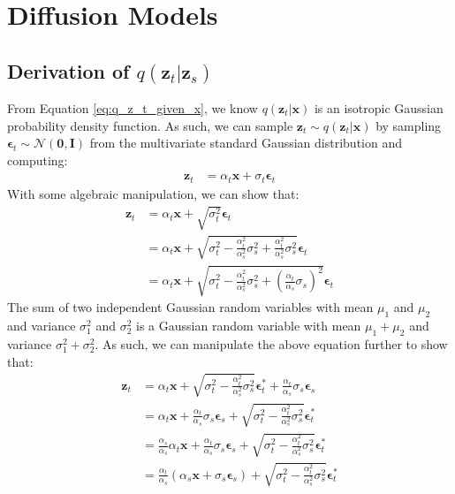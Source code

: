 \documentclass[ oneside,%
                    author={George Herbert},
                    degree={MSci},
                     title={Video Diffusion Models for Climate Simulations},
                  subtitle={}]{dissertation}
\begin{document}
\appendix

\chapter{Diffusion Models}
\label{appx:diffusion}

\section{Derivation of $q(\mathbf{z}_t|\mathbf{z}_s)$}
\label{appx:diffusion_q_z_t_given_z_s}

From Equation \ref{eq:q_z_t_given_x}, we know $q(\mathbf{z}_t|\mathbf{x})$ is an isotropic Gaussian probability density function. As such, we can sample $\mathbf{z}_t\sim q(\mathbf{z}_t|\mathbf{x})$ by sampling $\boldsymbol\epsilon_t\sim\mathcal{N}(\mathbf{0}, \mathbf{I})$ from the multivariate standard Gaussian distribution and computing:
\begin{align}
      \mathbf{z}_t&=\alpha_t\mathbf{x}+\sigma_t\boldsymbol\epsilon_t\label{eq:z_t}
\end{align}
With some algebraic manipulation, we can show that:
\begin{align}
      \mathbf{z}_t&=\alpha_t\mathbf{x}+\sqrt{\sigma_t^2}\boldsymbol\epsilon_t\\
      &=\alpha_t\mathbf{x}+\sqrt{\sigma_t^2-\frac{\alpha_t^2}{\alpha_s^2}\sigma_s^2+\frac{\alpha_t^2}{\alpha_s^2}\sigma_s^2}\boldsymbol\epsilon_t\\
      &=\alpha_t\mathbf{x}+\sqrt{\sigma_t^2-\frac{\alpha_t^2}{\alpha_s^2}\sigma_s^2+\left(\frac{\alpha_t}{\alpha_s}\sigma_s\right)^2}\boldsymbol\epsilon_t
\end{align}
The sum of two independent Gaussian random variables with mean $\mu_1$ and $\mu_2$ and variance $\sigma_1^2$ and $\sigma_2^2$ is a Gaussian random variable with mean $\mu_1+\mu_2$ and variance $\sigma_1^2+\sigma_2^2$. As such, we can manipulate the above equation further to show that:
\begin{align}
      \mathbf{z}_t&=\alpha_t\mathbf{x}+\sqrt{\sigma_t^2-\frac{\alpha_t^2}{\alpha_s^2}\sigma_s^2}\boldsymbol\epsilon_t^*+\frac{\alpha_t}{\alpha_s}\sigma_s\boldsymbol\epsilon_s\\
      &=\alpha_t\mathbf{x}+\frac{\alpha_t}{\alpha_s}\sigma_s\boldsymbol\epsilon_s+\sqrt{\sigma_t^2-\frac{\alpha_t^2}{\alpha_s^2}\sigma_s^2}\boldsymbol\epsilon_t^*\\
      &=\frac{\alpha_s}{\alpha_s}\alpha_t\mathbf{x}+\frac{\alpha_t}{\alpha_s}\sigma_s\boldsymbol\epsilon_s+\sqrt{\sigma_t^2-\frac{\alpha_t^2}{\alpha_s^2}\sigma_s^2}\boldsymbol\epsilon_t^*\\
      &=\frac{\alpha_t}{\alpha_s}(\alpha_s\mathbf{x}+\sigma_s\boldsymbol\epsilon_s)+\sqrt{\sigma_t^2-\frac{\alpha_t^2}{\alpha_s^2}\sigma_s^2}\boldsymbol\epsilon_t^*\\
\end{align}
\end{document}

